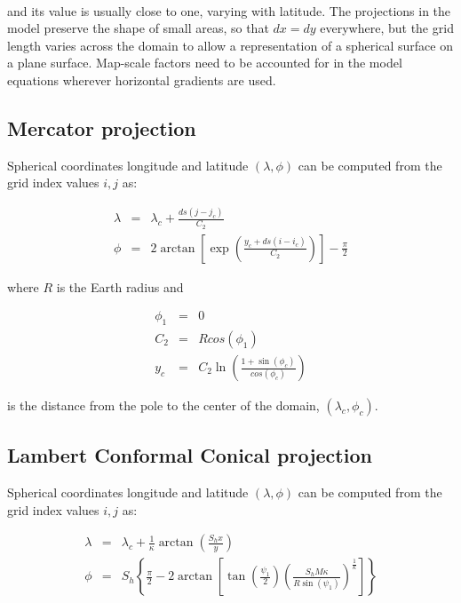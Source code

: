 \noindent \\ and its value is usually close to one, varying with latitude. The
projections in the model preserve the shape of small areas, so that $dx=dy$
everywhere, but the grid length varies across the domain to allow a
representation of a spherical surface on a plane surface.
Map-scale factors need to be accounted for in the model equations wherever
horizontal gradients are used.

\subsection{Mercator projection}

Spherical coordinates longitude and latitude $(\lambda, \phi)$ can be computed
from the grid index values $i,j$ as:

\begin{eqnarray}
  \lambda &=& \lambda_c + \frac{ds \left(j-j_c\right)}{C_2} \\
  \phi &=& 2 \arctan\left[\exp\left(\frac{y_c + 
         ds\left(i-i_c\right)}{C_2}\right)\right]-\frac{\pi}{2}
\end{eqnarray}

where $R$ is the Earth radius and

\begin{eqnarray}
  \phi_1 &=& 0 \\
  C_2 &=& R cos(\phi_1) \\
  y_c &=& C_2 \ln \left(\frac{1+\sin(\phi_c)}{cos(\phi_c)}\right)
\end{eqnarray}

is the distance from the pole to the center of the domain, $(\lambda_c,\phi_c)$.

\subsection{Lambert Conformal Conical projection}

Spherical coordinates longitude and latitude $(\lambda, \phi)$ can be computed
from the grid index values $i,j$ as:

\begin{eqnarray}
  \lambda &=& \lambda_c +
         \frac{1}{\kappa}\arctan\left(\frac{S_h x}{y}\right) \\
   \phi &=& S_h \left\{ \frac{\pi}{2} - 
          2 \arctan\left[ \tan\left(\frac{\psi_1}{2}\right) \left(
         \frac{S_h M \kappa}{R \sin(\psi_1)}\right)^{\frac{1}{\kappa}}\right]
         \right\}
\end{eqnarray}

